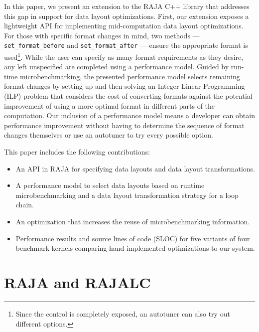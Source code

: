 \documentclass[sigconf]{acmart}
\begin{document}
In this paper, we present an extension to the RAJA C++ library that addresses this gap in support for data layout optimizations.
First, our extension exposes a lightweight API for implementing mid-computation data layout optimizations.
For those with specific format changes in mind, two methods --- \verb.set_format_before. and \verb.set_format_after. --- ensure the appropriate format is used\footnote{Since the control is completely exposed, an autotuner can also try out different options.}.
While the user can specify as many format requirements as they desire, any left unspecified are completed using a performance model.
Guided by run-time microbenchmarking, the presented performance model selects remaining format changes by setting up and then solving an Integer Linear Programming (ILP) problem that considers the cost of converting formats against the potential improvement of using a more optimal format in different parts of the computation.
Our inclusion of a performance model means a developer can obtain performance improvement without having to determine the sequence of format changes themselves or use an autotuner to try every possible option.

This paper includes the following contributions:
\begin{itemize}
\item An API in RAJA for specifying data layouts and data layout transformations.
\item A performance model to select data layouts based on runtime microbenchmarking and a data layout transformation strategy for a loop chain.
\item An optimization that increases the reuse of microbenchmarking information.
\item Performance results and source lines of code (SLOC) for five variants of four benchmark kernels comparing hand-implemented optimizations to our system.
\end{itemize} 


\section{RAJA and RAJALC}
\end{document}
